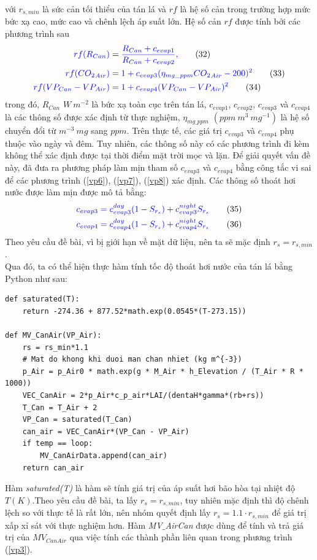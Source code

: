 \documentclass[13pt,a4paper]{article}
\begin{document}
			với $r_{s,min}$ là sức cản tối thiểu của tán lá và $rf$ là hệ số cản trong trường hợp mức bức xạ cao, mức  cao và chênh lệch áp suất lớn. Hệ số cản $rf$ được tính bởi các phương trình sau
			\begin{align}
				\textcolor{blue}{
					rf(R_{Can})} &= \textcolor{blue}{\dfrac{R_{Can} + c_{evap1}}{R_{Can} + c_{evap2}}, }
					\tag{32}\label{vp6} \\
					\textcolor{blue}{rf({CO_2}_{Air})} &= \textcolor{blue}{1 + c_{evap3}(\eta_{mg\_ppm} {CO_2}_{Air} - 200)^2} 
					\tag{33}\label{vp7} \\
					\textcolor{blue}{rf(VP_{Can} - VP_{Air})} &= \textcolor{blue}{1 + c_{evap4}(VP_{Can} - VP_{Air})^2}
					\tag{34}\label{vp8}
				\color{blue}
			\end{align}
			trong đó, $R_{Can}$ ${W\ m^{-2}}$ là bức xạ toàn cục trên tán lá, $c_{evap1}$, $c_{evap2}$, $c_{evap3}$ và $c_{evap4}$ là các thông số được xác định từ thực nghiệm, $\eta_{mg\_ppm}$ $(ppm\ m^{3}\ mg^{-1})$ là hệ số chuyển đổi từ $m^{-3}\ mg$  sang $ppm$. Trên thực tế, các giá trị $c_{evap3}$ và $c_{evap4}$ phụ thuộc vào ngày và đêm. Tuy nhiên, các thông số này có các phương trình đi kèm không thể xác định được tại thời điểm mặt trời mọc và lặn. Để giải quyết vấn đề này, \cite{Sta93} đã đưa ra phương pháp làm mịn tham số $c_{evap3}$ và $c_{evap4}$ bằng công tắc vi sai để các phương trình (\ref{vp6}), (\ref{vp7}), (\ref{vp8}) xác định. Các thông số thoát hơi nước được làm mịn được mô tả bằng:
			\begin{align}
				\textcolor{blue}{
					c_{evap3} = c^{day}_{evap3}(1 - S_{r_s}) + c^{night}_{evap3} S_{r_s}}
					\tag{35}\label{vp9} \\
				\textcolor{blue}{
					c_{evap4} = c^{day}_{evap4}(1 - S_{r_s}) + c^{night}_{evap4} S_{r_s}} 
					\tag{36}\label{vp10}
			\end{align}
			Theo yêu cầu đề bài, vì bị giới hạn về mặt dữ liệu, nên ta sẽ mặc định $r_s = r_{s,min}$. \\
			Qua đó, ta có thể hiện thực hàm tính tốc độ thoát hơi nước của tán lá bằng Python như sau:
\begin{lstlisting}
def saturated(T):
	return -274.36 + 877.52*math.exp(0.0545*(T-273.15))	

def MV_CanAir(VP_Air):
	rs = rs_min*1.1
	# Mat do khong khi duoi man chan nhiet (kg m^{-3})
	p_Air = p_Air0 * math.exp(g * M_Air * h_Elevation / (T_Air * R * 1000))  
	VEC_CanAir = 2*p_Air*c_p_air*LAI/(dentaH*gamma*(rb+rs))
	T_Can = T_Air + 2
	VP_Can = saturated(T_Can)
	can_air = VEC_CanAir*(VP_Can - VP_Air)
	if temp == loop:
		MV_CanAirData.append(can_air)
	return can_air
\end{lstlisting} 
			Hàm \textit{saturated(T)} là hàm sẽ tính giá trị của áp suất hơi bão hòa tại nhiệt độ $T(K)$.Theo yêu cầu đề bài, ta lấy $r_s = r_{s,min}$, tuy nhiên mặc định thì độ chênh lệch so với thực tế là rất lớn, nên nhóm quyết định lấy $r_s = 1.1 \cdot r_{s,min}$ để giá trị xấp xỉ sát với thực nghiệm hơn. Hàm \textit{MV$\_$AirCan} được dùng để tính và trả giá trị của $MV_{CanAir}$ qua việc tính các thành phần liên quan trong phương trình (\ref{vp3}). \\ \\
			
\end{document}
